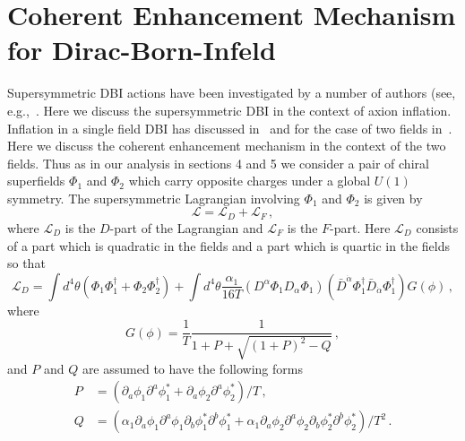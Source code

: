 \documentclass[12pt]{article}
\begin{document}
\section{Coherent Enhancement Mechanism for Dirac-Born-Infeld \label{sec:DBI}}
Supersymmetric DBI actions have been investigated by a number of authors (see, e.g.,~\cite{Khoury:2010gb, Khoury:2011da, Baumann:2011nk, Baumann:2011nm, Rocek:1997hi, Tseytlin:1999dj, Ito:2007hy, Billo:2008sp, Sasaki:2012ka, Aoki:2016tod}.
Here we discuss the supersymmetric DBI in the context of axion inflation.
Inflation in a single field DBI has discussed in~\cite{Sasaki:2012ka} and for the case of two fields in~\cite{Nath:2018xxe}.
Here we discuss the coherent enhancement mechanism in the context of the two fields.
Thus as in our analysis in sections 4 and 5 we consider a pair of chiral superfields $\Phi_1$ and $\Phi_2$ which carry opposite charges under a global $U\left(1\right)$ symmetry.
The supersymmetric Lagrangian involving $\Phi_1$ and $\Phi_2$ is given by
\begin{equation} \label{eq:DBI:lagrangianTerms}
  \mathcal{L} = \mathcal{L}_D + \mathcal{L}_F\,,
\end{equation}
where $\mathcal{L}_D$ is the $D$-part of the Lagrangian and $\mathcal{L}_F$ is the $F$-part.
Here $\mathcal{L}_D$ consists of a part which is quadratic in the fields and a part which is quartic in the fields so that
\begin{equation} \label{eq:DBI:lagrangianD}
  \mathcal{L}_D = \int d^4 \theta \left(\Phi_1 \Phi_1^\dagger + \Phi_2 \Phi_2^\dagger\right)
    + \int d^4 \theta \frac{\alpha_1}{16 T}
      \left(D^\alpha \Phi_1 D_\alpha \Phi_1\right)
      \left({\bar D}^{\dot\alpha} \Phi_1^\dagger {\bar D}_{\dot\alpha} \Phi_1^\dagger\right)
      G\left(\phi\right)\,,
\end{equation}
where
\begin{equation}
  G\left(\phi\right) = \frac{1}{T} \frac{1}{1 + P + \sqrt{\left(1 + P\right)^2 - Q}}\,,
\end{equation}
and $P$ and $Q$ are assumed to have the following forms
\begin{equation} \label{eq:DBI:PQ}
  \begin{aligned}
    P &= \left(
        \partial_a \phi_1 \partial^a \phi^*_1
      + \partial_a \phi_2 \partial^a \phi^*_2
    \right) / T\,,\\
    Q &= \left(
        \alpha_1 \partial_a \phi_1 \partial^a \phi_1 \partial_b \phi^*_1 \partial^b \phi^*_1
      + \alpha_1 \partial_a \phi_2 \partial^a \phi_2 \partial_b \phi^*_2 \partial^b \phi^*_2
    \right) / T^2\,.
  \end{aligned}
\end{equation}
\end{document}
